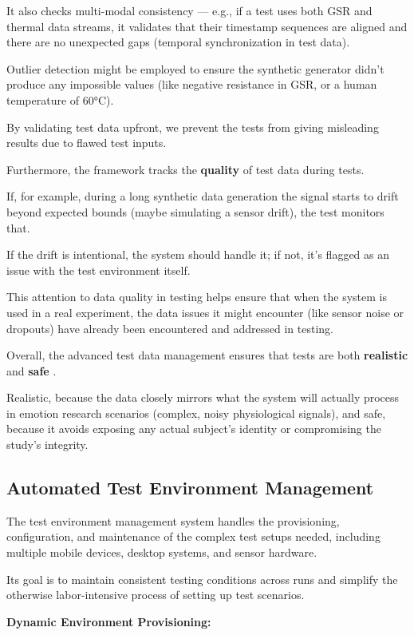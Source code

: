 {{It also checks multi-modal consistency --- e.g., if a test uses both GSR and thermal
data streams, it validates that their timestamp sequences are aligned and there are
no unexpected gaps (temporal synchronization in test data).

Outlier detection might be employed to ensure the synthetic generator didn't produce
any impossible values (like negative resistance in GSR, or a human temperature of
60°C).

By validating test data upfront, we prevent the tests from giving misleading results
due to flawed test inputs.

Furthermore, the framework tracks the \textbf{quality}
 of test data during tests.

If, for example, during a long synthetic data generation the signal starts to drift
beyond expected bounds (maybe simulating a sensor drift), the test monitors that.

If the drift is intentional, the system should handle it; if not, it's flagged as an
issue with the test environment itself.

This attention to data quality in testing helps ensure that when the system is used
in a real experiment, the data issues it might encounter (like sensor noise or
dropouts) have already been encountered and addressed in testing.

Overall, the advanced test data management ensures that tests are both
\textbf{realistic}
 and \textbf{safe}
.

Realistic, because the data closely mirrors what the system will actually process in
emotion research scenarios (complex, noisy physiological signals), and safe, because
it avoids exposing any actual subject's identity or compromising the study's
integrity.

\subsection{Automated Test Environment Management}

The test environment management system handles the provisioning, configuration, and
maintenance of the complex test setups needed, including multiple mobile devices,
desktop systems, and sensor hardware.

Its goal is to maintain consistent testing conditions across runs and simplify the
otherwise labor-intensive process of setting up test scenarios.

\textbf{Dynamic Environment Provisioning:}

}}
